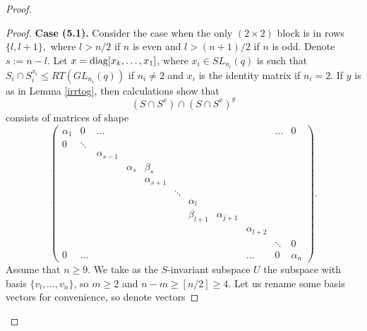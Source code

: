 \begin{proof}
\begin{proof}
{\bf Case (5.1).} Consider the case when  the only $(2\times 2)$ block is in  rows $\{l,l+1\},$ where $l>n/2$ if $n$ is even and $l>(n+1)/2$ if $n$ is odd. Denote $s:=n-l$. Let $x= \mathrm{diag}[x_k, \ldots, x_1]$, where $x_i\in SL_{n_i}(q)$ is such that $S_i \cap S_i^{x_i} \le RT(GL_{n_i}(q))$ if $n_i \ne 2$ and $x_i$ is the identity matrix if $n_i=2.$ If $y$ is as in Lemma \ref{irrtog}, then  calculations show that  
$$(S \cap S^x) \cap (S \cap S^x)^y$$ consists of matrices of shape 
{
\begin{equation}\label{ugol} 
  \left(\begin{smallmatrix} 
\alpha_1&0     &\dots         &            &              &      &           &             &            &\dots  &0  \\
0       &\ddots&              &            &              &      &           &             &            &       & \\
        &      &\alpha_{s-1}  &            &              &      &           &             &            &       &   \\
        &      &              &\alpha_{s}&\beta_{s}       &      &           &             &            &       &   \\
        &      &              &            &\alpha_{s+1  }&      &           &             &            &       &   \\
        &      &              &            &              &\ddots&           &             &            &       &   \\
        &      &              &            &              &      &\alpha_{l} &             &            &       &      \\
        &      &              &            &              &      &\beta_{l+1}&\alpha_{j+1} &            &       &   \\
        &      &              &            &              &      &           &             &\alpha_{l+2}&       & \\
        &      &              &            &              &      &           &             &            &\ddots & 0 \\
0       &\dots &              &            &              &      &           &             &     \dots  &  0    & \alpha_n 
\end{smallmatrix} \right).
\end{equation}
}
Assume that $n \ge 9$. We take as the $S$-invariant subspace $U$ the subspace with  basis $\{v_{l}, \ldots, v_n\}$, so
$m\ge 2$ and $n-m\ge [n/2] \ge 4.$  Let us rename some basis vectors for convenience, so denote vectors 

\end{proof}
\end{proof}
